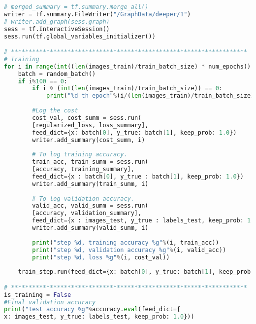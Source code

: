 \begin{lstlisting}[language=Python, label=lst:neuralnet.py, caption={neural\_net.py}, basicstyle=\tiny]
# merged_summary = tf.summary.merge_all()
writer = tf.summary.FileWriter("/GraphData/deeper/1")
# writer.add_graph(sess.graph)
sess = tf.InteractiveSession()
sess.run(tf.global_variables_initializer())

# *******************************************************************
# Training
for i in range(int((len(images_train)/train_batch_size) * num_epochs)):
	batch = random_batch()
	if i%100 == 0:
		if i % (int(len(images_train)/train_batch_size)) == 0:   
			print("%d th epoch"%(i/(len(images_train)/train_batch_size)))
		
		#Log the cost
		cost_val, cost_summ = sess.run(
		[regularized_loss, loss_summary],
		feed_dict={x: batch[0], y_true: batch[1], keep_prob: 1.0})
		writer.add_summary(cost_summ, i)
		
		# To log training accuracy.
		train_acc, train_summ = sess.run(
		[accuracy, training_summary],
		feed_dict={x : batch[0], y_true : batch[1], keep_prob: 1.0})
		writer.add_summary(train_summ, i)
		
		# To log validation accuracy.
		valid_acc, valid_summ = sess.run(
		[accuracy, validation_summary],
		feed_dict={x : images_test, y_true : labels_test, keep_prob: 1.0})
		writer.add_summary(valid_summ, i)
		
		print("step %d, training accuracy %g"%(i, train_acc))
		print("step %d, validation accuracy %g"%(i, valid_acc))
		print("step %d, loss %g"%(i, cost_val))
	
	train_step.run(feed_dict={x: batch[0], y_true: batch[1], keep_prob: drop_out})

# *******************************************************************
is_training = False
#Final validation accuracy
print("test accuracy %g"%accuracy.eval(feed_dict={
x: images_test, y_true: labels_test, keep_prob: 1.0}))
\end{lstlisting}
